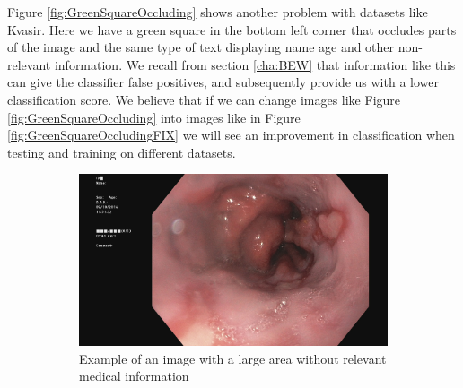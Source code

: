 Figure \ref{fig:GreenSquareOccluding} shows another problem with datasets like Kvasir.  Here we have a green square in the bottom left corner that occludes parts of the image and the same type of text displaying name age and other non-relevant information. We recall from section \ref{cha:BEW} that information like this can give the classifier false positives, and subsequently provide us with a lower classification score. 
We believe that if we can change images like Figure \ref{fig:GreenSquareOccluding} into images like in Figure \ref{fig:GreenSquareOccludingFIX} we will see an improvement in classification when testing and training on different datasets.


\begin{figure}
     \centering
     \begin{subfigure}[b]{0.4\textwidth}
         \centering
         \includegraphics[height=\textwidth, width=\textwidth]{experiments/figures/leftframe.jpg}
         \caption{Example of an image with a large area without relevant medical information}
         \label{fig:LargeLeftBlack}
     \end{subfigure}
     \hfill
     \begin{subfigure}[b]{0.4\textwidth}
         \centering

\end{subfigure}
\end{figure}
